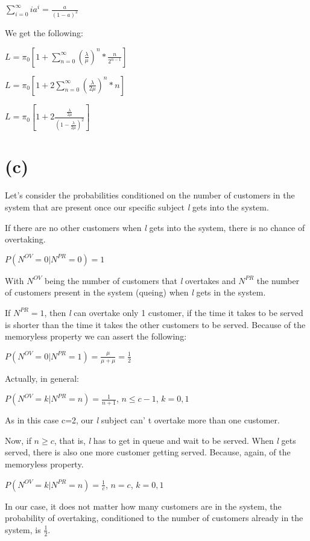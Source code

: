 \documentclass[]{article}
\begin{document}
\(\sum_{i=0}^{\infty} i a^i = \frac{a}{(1-a)^2}\)

We get the following:

\(L = \pi_0 [1 + \sum_{n=0}^{\infty} (\frac{\lambda}{\mu})^n * \frac{n}{2^{n-1}}]\)

\(L = \pi_0 [1 + 2 \sum_{n=0}^{\infty} (\frac{\lambda}{2 \mu})^n * n]\)

\(L = \pi_0 [1 + 2 \frac{\frac{\lambda}{2 \mu}}{(1 - \frac{\lambda}{2 \mu})^2}]\)

\hypertarget{c-1}{%
\section{(c)}\label{c-1}}

Let's consider the probabilities conditioned on the number of customers
in the system that are present once our specific subject \emph{l} gets
into the system.

If there are no other customers when \emph{l} gets into the system,
there is no chance of overtaking.

\(P(N^{OV} = 0 | N^{PR} = 0) = 1\)

With \(N^{OV}\) being the number of customers that \emph{l} overtakes
and \(N^{PR}\) the number of customers present in the system (queing)
when \emph{l} gets in the system.

If \(N^{PR} = 1\), then \emph{l} can overtake only 1 customer, if the
time it takes to be served is shorter than the time it takes the other
customers to be served. Because of the memoryless property we can assert
the following:

\(P(N^{OV} = 0 | N^{PR} = 1) = \frac{\mu}{\mu + \mu} = \frac{1}{2}\)

Actually, in general:

\(P(N^{OV} = k | N^{PR} = n) = \frac{1}{n+1}\), \(n \leq c - 1\),
\(k = 0,1\)

As in this case c=2, our \emph{l} subject can' t overtake more than one
customer.

Now, if \(n \geq c\), that is, \emph{l} has to get in queue and wait to
be served. When \emph{l} gets served, there is also one more customer
getting served. Because, again, of the memoryless property.

\(P(N^{OV} = k | N^{PR} = n) = \frac{1}{c}\), \(n = c\), \(k = 0,1\)

In our case, it does not matter how many customers are in the system,
the probability of overtaking, conditioned to the number of customers
already in the system, is \(\frac{1}{2}\).
\end{document}
